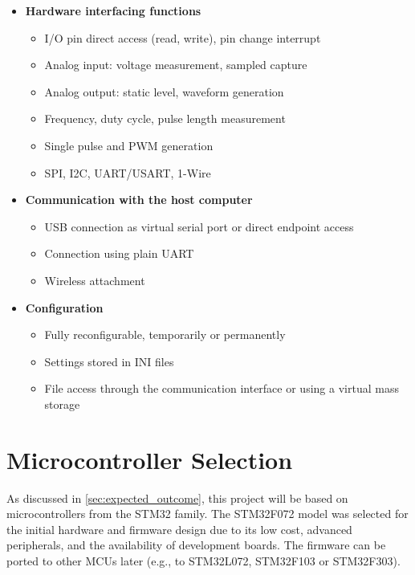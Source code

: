 \begin{itemize}
	\item \textbf{Hardware interfacing functions}
		\begin{itemize}
			\item I/O pin direct access (read, write), pin change interrupt
			\item Analog input: voltage measurement, sampled capture
			\item Analog output: static level, waveform generation
			\item Frequency, duty cycle, pulse length measurement
			\item Single pulse and \gls{PWM} generation
			\item \gls{SPI}, \gls{I2C}, \gls{UART}/\gls{USART}, 1-Wire
		\end{itemize}
	\pagebreak[0]
	\item \textbf{Communication with the host computer}
		\begin{itemize}
			\item \gls{USB} connection as virtual serial port or direct endpoint access
			\item Connection using plain \gls{UART}
			\item Wireless attachment
		\end{itemize}
	\item \textbf{Configuration}
		\begin{itemize}
			\item Fully reconfigurable, temporarily or permanently
			\item Settings stored in INI files
			\item File access through the communication interface or using a virtual mass storage
		\end{itemize}
\end{itemize}

\section{Microcontroller Selection}

As discussed in \cref{sec:expected_outcome}, this project will be based on microcontrollers from the STM32 family. The STM32F072 model was selected for the initial hardware and firmware design due to its low cost, advanced peripherals, and the availability of development boards. The firmware can be ported to other \glspl{MCU} later (e.g., to STM32L072, STM32F103 or STM32F303).


